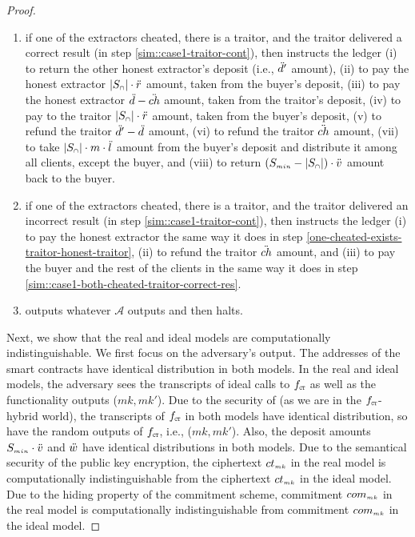 \begin{proof}
\begin{enumerate}
\begin{enumerate}
%
\item if one of the extractors cheated, there is a traitor, and the traitor delivered a correct result (in step \ref{sim::case1-traitor-cont}), then instructs the ledger (i) to return the other honest extractor's deposit (i.e., $\ddot{d}'$ amount), (ii) to pay the honest extractor $|S_{\scriptscriptstyle\cap}|\cdot \ddot{r}$ amount, taken from the buyer's deposit,  (iii) to pay the honest extractor $\ddot{d}- \ddot{ch}$ amount, taken from the traitor's deposit,   (iv) to pay to the traitor $|S_{\scriptscriptstyle\cap}|\cdot \ddot{r}$ amount, taken from the buyer’s deposit,  (v) to refund the traitor $\ddot{d}'-\ddot{d}$ amount, (vi) to refund the traitor $\ddot{ch}$ amount,  (vii) to take $|S_{\scriptscriptstyle\cap}|\cdot m\cdot \ddot{l}$ amount from the buyer's deposit and distribute it among all clients, except the buyer, and (viii) to return $(S_{\scriptscriptstyle min}-|S_{\scriptscriptstyle\cap}|)\cdot \ddot{v}$ amount back  to the buyer. 
%
\item if one of the extractors cheated, there is a traitor, and the traitor delivered an incorrect result (in step \ref{sim::case1-traitor-cont}), then instructs the ledger (i) to pay the honest extractor the same way it does in step \ref{one-cheated-exists-traitor-honest-traitor}, (ii) to refund the traitor  $\ddot{ch}$ amount, and (iii)  to pay the buyer and the rest of the clients in the same way it does in step \ref{sim::case1-both-cheated-traitor-correct-res}.
%
\item outputs whatever $\mathcal{A}$ outputs and then halts.
%
\end{enumerate}
%
\end{enumerate}



Next, we show that the real and ideal models are computationally indistinguishable. We first focus on the adversary’s output. The addresses of the smart contracts have identical distribution in both models. In the real and ideal models, the adversary sees the transcripts of ideal calls to $f_{\scriptscriptstyle \mathtt{CT}}$ as well as the functionality outputs ($mk,  mk'$). Due to the security of \ct (as we are in the $f_{\scriptscriptstyle \mathtt{CT}}$-hybrid world), the transcripts of $f_{\scriptscriptstyle \mathtt{CT}}$ in both models have identical distribution, so have the random outputs of $f_{\scriptscriptstyle \mathtt{CT}}$, i.e., ($mk,  mk'$). Also, the deposit amounts $S_{\scriptscriptstyle min}\cdot \ddot{v}$ and $\ddot{w}$ have identical distributions in both models. Due to the semantical security of the public key encryption, the ciphertext $ct_{\scriptscriptstyle mk}$ in the real model is computationally indistinguishable from the ciphertext $ct_{\scriptscriptstyle {mk}}$ in the ideal model. Due to the hiding property of the commitment scheme, commitment $com_{\scriptscriptstyle mk}$ in the real model is computationally indistinguishable from commitment $com_{\scriptscriptstyle {mk}}$ in the ideal model.  


\end{proof}
